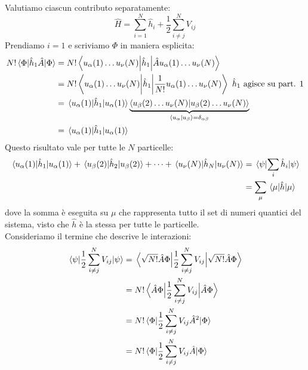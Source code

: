 Valutiamo ciascun contributo separatamente:
\begin{equation*}
    \hat H = \sum_{i=1}^N \hat h_i + \frac 12 \sum_{i\neq j}^NV_{ij} 
\end{equation*}
Prendiamo $i=1$ e scriviamo $\Phi$ in maniera esplicita:
\begin{equation*}
    \begin{aligned}
        N!\mel{\Phi}{\hat h_1\hat A}{\Phi}
        & = N!\mel{u_\alpha(1)\dots u_\nu(N)}{\hat h_1}{\hat A u_\alpha(1)\dots u_\nu(N)} \\
        & = N!\mel{u_\alpha(1)\dots u_\nu(N)}{\hat h_1}{\frac{1}{N!} u_\alpha(1)\dots u_\nu(N)}  \ \hat h_1 \text{ agisce su part. 1}\\
        & = \mel{u_\alpha(1)}{\hat h_1}{u_\alpha(1)}\underbrace{\ip{u_\beta(2)\dots u_\nu(N)}{u_\beta(2)\dots u_\nu(N)}}_{\ip{u_\alpha}{u_\beta}=\delta_{\alpha\beta}}\\
        & = \mel{u_\alpha(1)}{\hat h_1}{u_\alpha(1)} 
    \end{aligned}
\end{equation*}
Questo risultato vale per tutte le $N$ particelle:
\begin{equation*}
    \begin{aligned}
        \mel{u_\alpha(1)}{\hat h_1}{u_\alpha(1)} + \mel{u_\beta(2)}{\hat h_2}{u_\beta(2)} + \dots + \mel{u_\nu(N)}{\hat h_N}{u_\nu(N)} 
        & = \mel{\psi}{\sum_i \hat h_i}{\psi} \\
        & = \sum_\mu\mel{\mu}{\hat h}{\mu}
    \end{aligned}
\end{equation*}
dove la somma è eseguita su $\mu$ che rappresenta tutto il set di numeri quantici del sistema, visto che $\hat h$ è la stessa per tutte le particelle. \\
Consideriamo il termine che descrive le interazioni:
\begin{equation*}
    \begin{aligned}
    \mel{\psi}{\frac12\sum_{i\neq j}^N V_{ij}}{\psi}
    & =\mel{\sqrt{N!}\hat A \Phi}{\frac12\sum_{i\neq j}^N V_{ij}}{\sqrt{N!}\hat A \Phi} \\
    & =N!\mel{\hat A \Phi}{\frac12\sum_{i\neq j}^N V_{ij}}{\hat A \Phi} \\
    & =N!\mel{\Phi}{\frac12\sum_{i\neq j}^N V_{ij}\hat A^2}{\Phi} \\
    & =N!\mel{\Phi}{\frac12\sum_{i\neq j}^N V_{ij}\hat A}{\Phi} \\
    \end{aligned}
\end{equation*}
